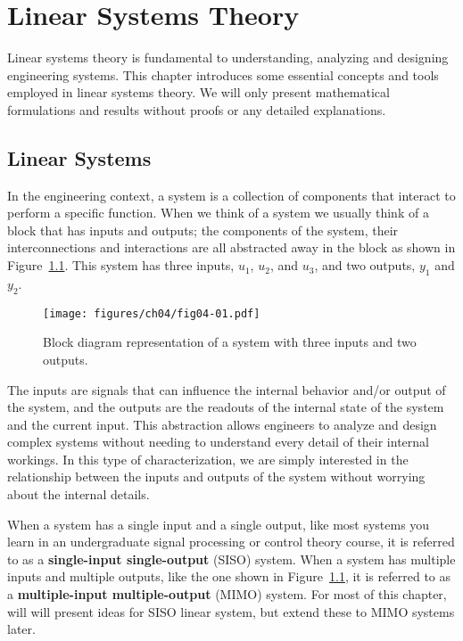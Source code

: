\chapter{Linear Systems Theory}\label{chp:linearsystems}

Linear systems theory is fundamental to understanding,  analyzing and designing engineering systems. This chapter introduces some essential concepts and tools employed in linear systems theory. We will only present mathematical formulations and results without proofs or any detailed explanations.

\section{Linear Systems}
In the engineering context, a system is a collection of components that interact to perform a specific function. When we think of a system we usually think of a block that has inputs and outputs; the components of the system, their interconnections and interactions are all abstracted away in the block as shown in Figure~\ref{fig:04-01-system}. This system has three inputs, $u_1$, $u_2$, and $u_3$, and two outputs, $y_1$ and $y_2$. 
\begin{figure}[htbp]
    \centering
    \texttt{[image: figures/ch04/fig04-01.pdf]}
    \caption{Block diagram representation of a system with three inputs and two outputs.}
    \label{fig:04-01-system}
\end{figure}
The inputs are signals that can influence the internal behavior and/or output of the system, and the outputs are the readouts of the internal state of the system and the current input. This abstraction allows engineers to analyze and design complex systems without needing to understand every detail of their internal workings. In this type of characterization, we are simply interested in the relationship between the inputs and outputs of the system without worrying about the internal details.

When a system has a single input and a single output, like most systems you learn in an undergraduate signal processing or control theory course, it is referred to as a \textbf{single-input single-output} (SISO) system. When a system has multiple inputs and multiple outputs, like the one shown in Figure~\ref{fig:04-01-system}, it is referred to as a \textbf{multiple-input multiple-output} (MIMO) system. For most of this chapter, will will present ideas for SISO linear system, but extend these to MIMO systems later.

